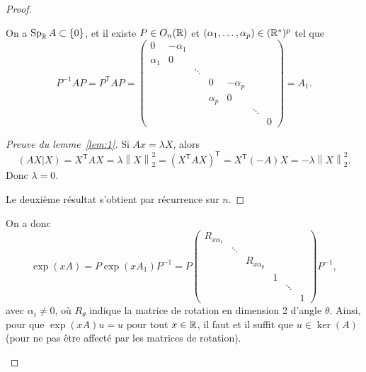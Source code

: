 \documentclass[12pt]{article}
\begin{document}
\begin{proof}
\begin{enumerate}
		\begin{lemma}
			\label{lem:1}
			On a $\operatorname{Sp}_{\mathbb{R}}A\subset\left\lbrace0\right\rbrace$, et il existe $P\in O_n(\mathbb{R})$ et $(\alpha_1,\dots,\alpha_p)\in(\mathbb{R}^{*})^{p}$ tel que 
			\begin{equation*}
				P^{-1}AP=P^{\mathsf{T}}AP=\begin{pmatrix}
					0&-\alpha_1\\
					\alpha_1&0\\
					&&\ddots\\
					&&&0&-\alpha_p\\
					&&&\alpha_p&0\\
					&&&&&\ddots\\
					&&&&&&0
				\end{pmatrix}=A_1.
			\end{equation*}
		\end{lemma}
		\begin{proof}[Preuve du lemme~\ref{lem:1}]
			Si $Ax=\lambda X$, alors 
			\begin{equation*}
				(AX|X)=X^{\mathsf{T}}AX=\lambda\left\lVert X\right\rVert_{2}^{2}=(X^{\mathsf{T}}AX)^{\mathsf{T}}=X^{\mathsf{T}}(-A)X=-\lambda\left\lVert X\right\rVert_{2}^{2}.
			\end{equation*}
			Donc $\lambda=0$.

			Le deuxième résultat s'obtient par récurrence sur $n$.
		\end{proof}

		On a donc 
		\begin{equation*}
			\exp(xA)=P\exp(xA_1)P^{-1}=P\begin{pmatrix}
				R_{x\alpha_1}\\
				&\ddots\\
				&&R_{x\alpha_p}\\
				&&&1\\
				&&&&\ddots\\
				&&&&&1
			\end{pmatrix}P^{-1},
		\end{equation*}
		avec $\alpha_{i}\neq0$, où $R_{\theta}$ indique la matrice de rotation en dimension 2 d'angle $\theta$. Ainsi, pour que $\exp(xA)u=u$ pour tout $x\in\mathbb{R}$, il faut et il suffit que $u\in\ker(A)$ (pour ne pas être affecté par les matrices de rotation).
	\end{enumerate}
\end{proof}
\end{document}
